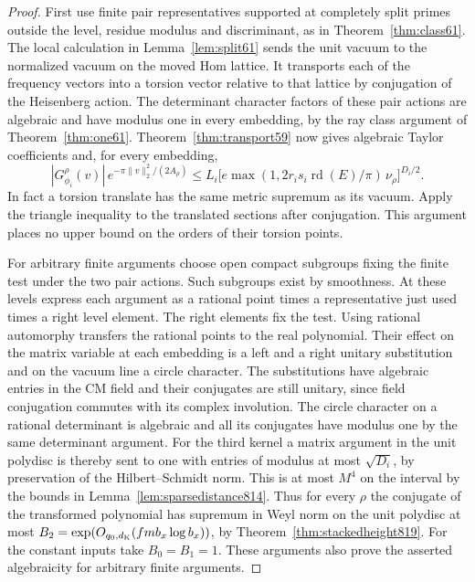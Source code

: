 \documentclass[a4paper,11pt]{article}
\theoremstyle{definition}
\theoremstyle{remark}
\numberwithin{equation}{section}
\begin{document}
\begin{proof}
First use finite pair representatives supported at completely
split primes outside the level, residue modulus and discriminant,
as in Theorem~\ref{thm:class61}. The local calculation in
Lemma~\ref{lem:split61} sends the unit vacuum to the normalized
vacuum on the moved Hom lattice. It transports each of the
frequency vectors into a torsion vector relative to that lattice
by conjugation of the Heisenberg action. The determinant character
factors of these pair actions are algebraic and have modulus one
in every embedding, by the ray class argument of
Theorem~\ref{thm:one61}. Theorem~\ref{thm:transport59} now
gives algebraic Taylor coefficients and, for every embedding,
\[
 |G_{\phi_i}^{\rho}(v)|\,e^{-\pi\|v\|_2^2/(2A_\rho)}
   \le L_i\bigl[e\max(1,2r_i s_i\operatorname{rd}(E)/\pi)
                      \,\nu_\rho\bigr]^{D_i/2}.
\]
In fact a torsion translate has the same metric supremum as
its vacuum. Apply the triangle inequality to the translated
sections after conjugation. This argument places no upper bound
on the orders of their torsion points.

For arbitrary finite arguments choose open compact subgroups
fixing the finite test under the two pair actions. Such
subgroups exist by smoothness. At these levels express each
argument as a rational point times a representative just used
times a right level element. The right elements fix the test.
Using rational automorphy transfers the rational points to
the real polynomial. Their effect on the matrix variable
at each embedding is a left and a right unitary substitution
and on the vacuum line a circle character. The substitutions
have algebraic entries in the CM field and their conjugates
are still unitary, since field conjugation commutes with its
complex involution. The circle character on a rational
determinant is algebraic and all its conjugates have modulus
one by the same determinant argument. For the third kernel
a matrix argument in the unit polydisc is thereby sent to one
with entries of modulus at most \(\sqrt{D_i}\), by preservation
of the Hilbert--Schmidt norm. This is at most \(M^4\) on the
interval by the bounds in Lemma~\ref{lem:sparsedistance814}.
Thus for every \(\rho\) the conjugate of the transformed
polynomial has supremum in Weyl norm on the unit polydisc
at most \(B_2=\exp(O_{q_0,d_{\rm K}}(f m b_x\log b_x))\),
by Theorem~\ref{thm:stackedheight819}. For the constant inputs
take \(B_0=B_1=1\). These arguments also prove the asserted
algebraicity for arbitrary finite arguments.


\end{proof}
\end{document}
